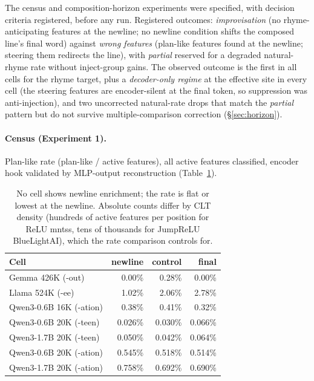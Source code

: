 \documentclass[11pt]{article}
\begin{document}
The census and composition-horizon experiments were specified, with decision criteria registered, before any run. Registered outcomes: \emph{improvisation} (no rhyme-anticipating features at the newline; no newline condition shifts the composed line's final word) against \emph{wrong features} (plan-like features found at the newline; steering them redirects the line), with \emph{partial} reserved for a degraded natural-rhyme rate without inject-group gains. The observed outcome is the first in all cells for the rhyme target, plus a \emph{decoder-only regime} at the effective site in every cell (the steering features are encoder-silent at the final token, so suppression was anti-injection), and two uncorrected natural-rate drops that match the \emph{partial} pattern but do not survive multiple-comparison correction (\S\ref{sec:horizon}).

\paragraph{Census (Experiment 1).}
Plan-like rate (plan-like / active features), all active features classified, encoder hook validated by MLP-output reconstruction (Table~\ref{tab:census}).

\begin{table}[h]
\centering\small
\begin{tabular}{@{}lrrr@{}}
\toprule
Cell & newline & control & final \\
\midrule
Gemma 426K (-out) & 0.00\% & 0.28\% & 0.00\% \\
Llama 524K (-ee) & 1.02\% & 2.06\% & 2.78\% \\
Qwen3-0.6B 16K (-ation) & 0.38\% & 0.41\% & 0.32\% \\
Qwen3-0.6B 20K (-teen) & 0.026\% & 0.030\% & 0.066\% \\
Qwen3-1.7B 20K (-teen) & 0.050\% & 0.042\% & 0.064\% \\
Qwen3-0.6B 20K (-ation) & 0.545\% & 0.518\% & 0.514\% \\
Qwen3-1.7B 20K (-ation) & 0.758\% & 0.692\% & 0.690\% \\
\bottomrule
\end{tabular}
\caption{No cell shows newline enrichment; the rate is flat or lowest at the newline. Absolute counts differ by CLT density (hundreds of active features per position for ReLU mntss, tens of thousands for JumpReLU BlueLightAI), which the rate comparison controls for.}
\label{tab:census}
\end{table}
\end{document}
